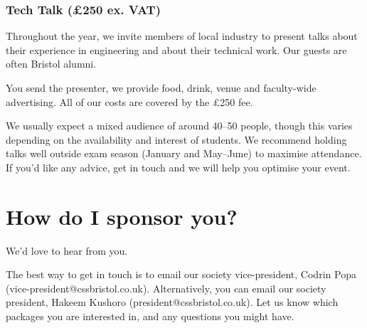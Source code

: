 \documentclass[]{article}
\begin{document}
\subsubsection*{Tech Talk (\pounds 250 ex. VAT)}

Throughout the year, we invite members of local industry to present talks about their experience in engineering and about their technical work. Our guests are often Bristol alumni.

You send the presenter, we provide food, drink, venue and faculty-wide advertising. All of our costs are covered by the \pounds 250 fee. 

We usually expect a mixed audience of around 40--50 people, though this varies depending on the availability and interest of students. We recommend holding talks well outside exam season (January and May--June) to maximise attendance. If you'd like any advice, get in touch and we will help you optimise your event.

\section*{How do I sponsor you?}

We'd love to hear from you. 

The best way to get in touch is to email our society vice-president, Codrin Popa (vice-president@cssbristol.co.uk). Alternatively, you can email our society president, Hakeem Kushoro (president@cssbristol.co.uk). Let us know which packages you are interested in, and any questions you might have.
\end{document}
